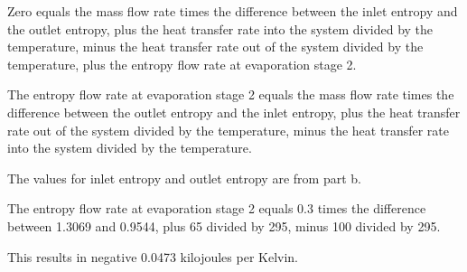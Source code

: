 Zero equals the mass flow rate times the difference between the inlet entropy and the outlet entropy, plus the heat transfer rate into the system divided by the temperature, minus the heat transfer rate out of the system divided by the temperature, plus the entropy flow rate at evaporation stage 2.

The entropy flow rate at evaporation stage 2 equals the mass flow rate times the difference between the outlet entropy and the inlet entropy, plus the heat transfer rate out of the system divided by the temperature, minus the heat transfer rate into the system divided by the temperature.

The values for inlet entropy and outlet entropy are from part b.

The entropy flow rate at evaporation stage 2 equals 0.3 times the difference between 1.3069 and 0.9544, plus 65 divided by 295, minus 100 divided by 295.

This results in negative 0.0473 kilojoules per Kelvin.